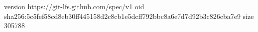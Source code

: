 version https://git-lfs.github.com/spec/v1
oid sha256:5c5fef58cd8eb30ff445158d2c8cb1e5dcff792bbc8a6e7d7d92b3c826cba7e9
size 305788
